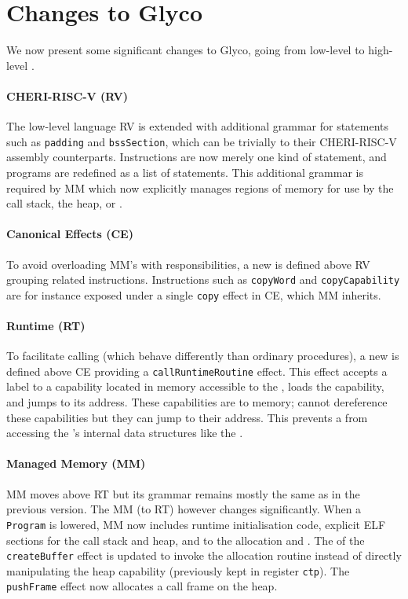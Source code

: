 \documentclass[main.tex]{subfiles}
\begin{document}
\section{Changes to Glyco} \label{sct:ghscc-changes}
We now present some significant changes to Glyco, going from low-level to high-level .

\paragraph{CHERI-RISC-V (RV)} The low-level language RV is extended with additional grammar for statements such as \texttt{padding} and \texttt{bssSection}, which can be  trivially to their CHERI-RISC-V assembly counterparts. Instructions are now merely one kind of statement, and programs are redefined as a list of statements. This additional grammar is required by MM which now explicitly manages regions of memory for use by the call stack, the heap, or .

\paragraph{Canonical Effects (CE)} To avoid overloading MM's  with responsibilities, a new  is defined above RV grouping related instructions. Instructions such as \texttt{copyWord} and \texttt{copyCapability} are for instance exposed under a single \texttt{copy} effect in CE, which MM inherits.

\paragraph{Runtime (RT)} To facilitate calling  (which behave differently than ordinary procedures), a new  is defined above CE providing a \texttt{callRuntimeRoutine} effect. This effect accepts a label to a capability located in memory accessible to the , loads the capability, and jumps to its address. These capabilities are  to  memory;  cannot dereference these capabilities but they can jump to their address. This prevents a  from accessing the 's internal data structures like the .

\paragraph{Managed Memory (MM)} MM moves above RT but its grammar remains mostly the same as in the previous version. The MM (to RT)  however changes significantly. When a \texttt{Program} is lowered, MM now includes runtime initialisation code, explicit ELF sections for the call stack and heap, and  to the allocation and  . The  of the \texttt{createBuffer} effect is updated to invoke the allocation routine instead of directly manipulating the heap capability (previously kept in register \texttt{ctp}). The \texttt{pushFrame} effect now allocates a call frame on the heap.
\end{document}
